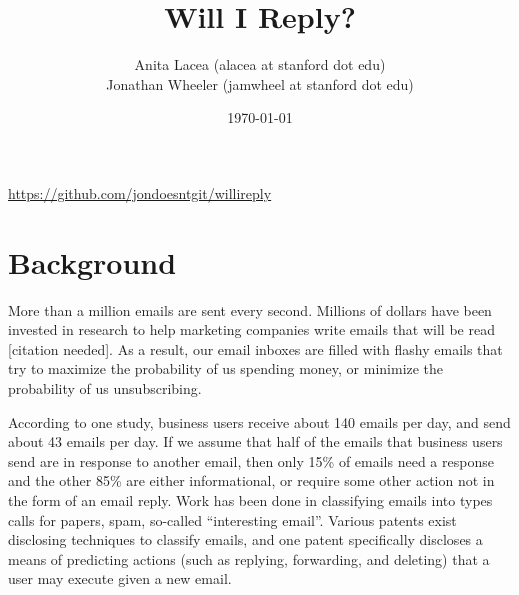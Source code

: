 \documentclass{article}
\title{Will I Reply?}
\author{Anita Lacea (alacea at stanford dot edu)\\Jonathan Wheeler (jamwheel at stanford dot edu)}
\date{\today}
\begin{document}
\maketitle
\vspace{-1cm}
\begin{center}
\href{https://github.com/jondoesntgit/willireply}{https://github.com/jondoesntgit/willireply}
\end{center}

\section{Background} More than a million emails are sent every second. Millions of dollars have been invested in research to help marketing companies write emails that will be read [citation needed]. As a result, our email inboxes are filled with flashy emails that try to maximize the probability of us spending money, or minimize the probability of us unsubscribing.

According to one study, business users receive about 140 emails per day, and send about 43 emails per day.\cite{emailstatistics} If we assume that half of the emails that business users send are in response to another email, then only 15\% of emails need a response and the other 85\% are either informational, or require some other action not in the form of an email reply. Work has been done in classifying emails into types calls for papers\cite{learningrulesthatclassifyemail}, spam\cite{filteringjunkemail}, so-called ``interesting email''\cite{emailclassification}. Various patents exist disclosing techniques to classify emails\cite{Goodman:2014ug,Bellegarda:2010wk,Romero:2005vs}, and one patent specifically discloses a means of predicting actions (such as replying, forwarding, and deleting) that a user may execute given a new email\cite{Weber:2012tv}.
\end{document}
